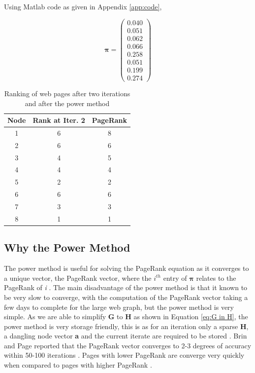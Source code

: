 \documentclass[11pt]{report}
\begin{document}
Using Matlab code as given in Appendix \ref{app:code}, 

\[\boldsymbol\pi = \left(
\begin{array}{c}
0.040 \\
0.051 \\
0.062 \\
0.066 \\
0.258 \\
0.051 \\
0.199 \\
0.274
\end{array}
\right)\]

\begin{table}[H] \caption{Ranking of web pages after two iterations and after the power method}
 \centering
 \begin{tabular} {c| c c} 
 Node & Rank at Iter. 2 & PageRank \\ [0.5ex] 
 \hline
 1&6&8\\
 2&6&6\\
 3&4&5\\
 4&4&4\\
 5&2&2\\
 6&6&6\\
 7&3&3\\
 8&1&1\\
 \end{tabular}
 \label{Table:PageRank and summ}
\end{table}

\subsection{Why the Power Method}\label{sec:why power}

The power method is useful for solving the PageRank equation as it converges to a unique vector, the PageRank vector, where the $i^{th}$ entry of $\boldsymbol\pi$ relates to the PageRank of \textit{i} \cite{ipsen2005analysis}. The main disadvantage of the power method is that it known to be very slow to converge, with the computation of the PageRank vector taking a few days to complete for the large web graph, but the power method is very simple. As we are able to simplify \textbf{G} to \textbf{H} as shown in Equation \eqref{eq:G in H}, the power method is very storage friendly, this is as for an iteration only a sparse \textbf{H}, a dangling node vector \textbf{a} and the current iterate are required to be stored \cite{langville}. Brin and Page reported that the PageRank vector converges to 2-3 degrees of accuracy within 50-100 iterations \cite{austin}. Pages with lower PageRank are converge very quickly when compared to pages with higher PageRank \cite{thorson2004modeling}.
\end{document}
